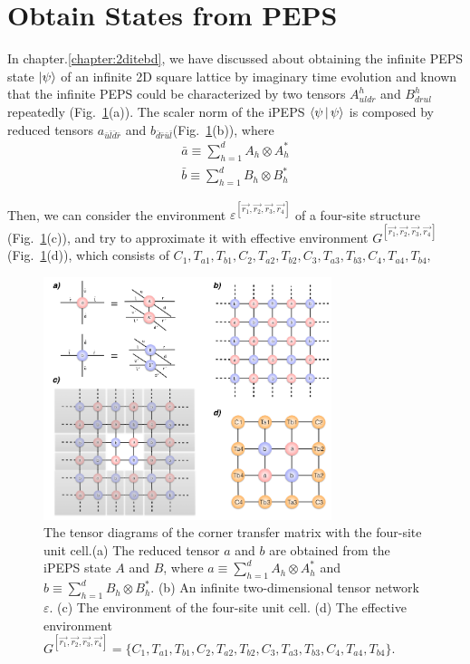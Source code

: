 \section{Obtain States from PEPS}
\label{2ditebdctm}
In chapter.\ref{chapter:2ditebd}, we have discussed about obtaining the infinite PEPS state $\Ket{\psi}$ of an infinite 2D square lattice by imaginary time evolution and known that the infinite PEPS could be characterized by two tensors $A^h_{uldr}$ and $B^h_{drul}$ repeatedly (Fig.~\ref{fig511}(a)). The scaler norm of the iPEPS $\Braket{\psi|\psi}$ is composed by reduced tensors $a_{\bar{u}\bar{l}\bar{d}\bar{r}}$ and $b_{\bar{d}\bar{r}\bar{u}\bar{l}}$(Fig.~\ref{fig511}(b)), where
\begin{align}
	\label{reduce_a}
	\bar{a} \equiv \sum_{h=1}^{d} A_{h} \otimes A^{*}_{h} \\
	\label{reduce_b}
	\bar{b} \equiv \sum_{h=1}^{d} B_{h} \otimes B^{*}_{h}
\end{align}

Then, we can consider the environment $\varepsilon^{\left[\vec{r_1},\vec{r_2},\vec{r_3},\vec{r_4}\right]}$ of a four-site structure (Fig.~\ref{fig511}(c)), and try to approximate it with effective environment $G^{\left[\vec{r_1},\vec{r_2},\vec{r_3},\vec{r_4}\right]}$ (Fig.~\ref{fig511}(d)), which consists of $C_1, T_{a1}, T_{b1},C_2, T_{a2}, T_{b2},C_3, T_{a3}, T_{b3},C_4, T_{a4}, T_{b4},$

\begin{figure}[ht]
	\centering
	\includegraphics[width=0.75\textwidth]{figures/fig511.png}
	\caption[The tensor diagrams of the corner transfer matrix with the four-site unit cell.]{The tensor diagrams of the corner transfer matrix with the four-site unit cell.(a) The reduced tensor $a$ and $b$ are obtained from the iPEPS state $A$ and $B$, where $a \equiv \sum_{h=1}^{d} A_{h} \otimes A^{*}_{h}$ and $b \equiv \sum_{h=1}^{d} B_{h} \otimes B^{*}_{h}$. (b) An infinite two-dimensional tensor network $\varepsilon$. (c) The environment of the four-site unit cell. (d) The effective environment $G^{\left[\vec{r_1},\vec{r_2},\vec{r_3},\vec{r_4}\right]} = \{ C_1, T_{a1}, T_{b1},C_2, T_{a2}, T_{b2},C_3, T_{a3}, T_{b3},C_4, T_{a4}, T_{b4}\}$.}
	\label{fig511}
\end{figure}

